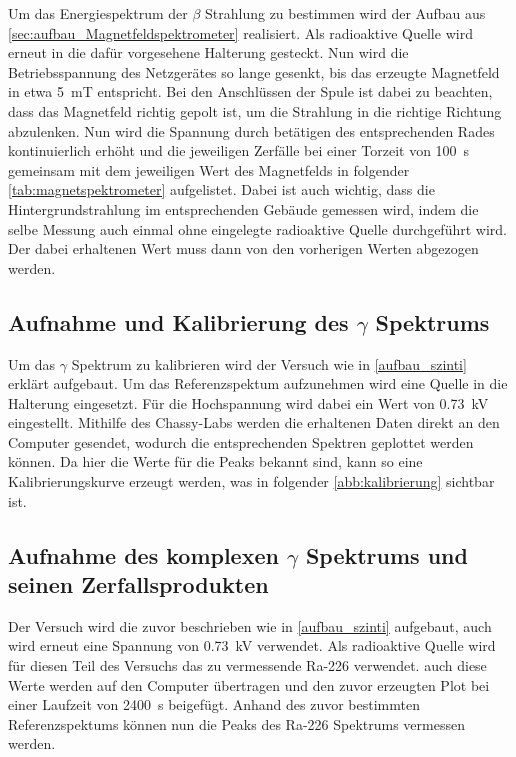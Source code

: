 \documentclass[12pt,english,ngerman]{scrartcl}
\begin{document}
Um das Energiespektrum der $\beta$ Strahlung zu bestimmen wird der Aufbau aus \autoref{sec:aufbau_Magnetfeldspektrometer} realisiert.
Als radioaktive Quelle wird erneut  in die dafür vorgesehene Halterung gesteckt. Nun wird die Betriebsspannung des
Netzgerätes so lange gesenkt, bis das erzeugte Magnetfeld in etwa \SI{5}{\milli\tesla} entspricht. Bei den Anschlüssen der 
Spule ist dabei zu beachten, dass das Magnetfeld richtig gepolt ist, um die Strahlung
in die richtige Richtung abzulenken. Nun wird die Spannung durch betätigen des entsprechenden Rades kontinuierlich erhöht
und die jeweiligen Zerfälle bei einer Torzeit von \SI{100}{\second} gemeinsam mit dem jeweiligen Wert des Magnetfelds in folgender
\autoref{tab:magnetspektrometer} aufgelistet. Dabei ist auch wichtig, dass die Hintergrundstrahlung im entsprechenden Gebäude
gemessen wird, indem die selbe Messung auch einmal ohne eingelegte radioaktive Quelle durchgeführt wird. Der dabei erhaltenen
Wert muss dann von den vorherigen Werten abgezogen werden.


\subsection{Aufnahme und Kalibrierung des \texorpdfstring{$\gamma$}{gamma} Spektrums}

Um das $\gamma$ Spektrum zu kalibrieren wird der Versuch wie in \autoref{aufbau_szinti} erklärt aufgebaut. Um das
Referenzspektum aufzunehmen wird eine  Quelle in die Halterung
eingesetzt. Für die Hochspannung wird dabei ein Wert von \SI{0.73}{\kilo\volt} eingestellt.
Mithilfe des Chassy-Labs werden die erhaltenen Daten direkt an den Computer gesendet, wodurch die entsprechenden Spektren geplottet
werden können. Da hier die Werte für die Peaks bekannt sind, kann so eine Kalibrierungskurve erzeugt werden, was in folgender 
\autoref{abb:kalibrierung} sichtbar ist.



\subsection{Aufnahme des komplexen \texorpdfstring{$\gamma$}{gamma} Spektrums und seinen Zerfallsprodukten}

Der Versuch wird die zuvor beschrieben wie in \autoref{aufbau_szinti} aufgebaut, auch wird erneut eine Spannung von \SI{0.73}{\kilo\volt}
verwendet. Als radioaktive Quelle wird für diesen Teil des Versuchs das zu vermessende Ra-226 verwendet. auch diese Werte werden 
auf den Computer übertragen und den zuvor erzeugten Plot bei einer Laufzeit von \SI{2400}{\second} beigefügt. Anhand des zuvor
bestimmten Referenzspektums können nun die Peaks des Ra-226 Spektrums vermessen werden.
\end{document}
